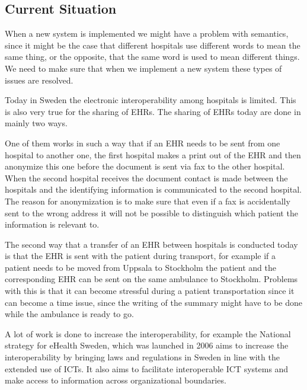 \documentclass[14pt]{article}
\begin{document}
\label{sec:interopDefinition}

\subsection{Current Situation} %
When a new system is implemented we might have a problem with semantics, since it might be the case that different hospitals use different words to mean the same thing, or the opposite, that the same word is used to mean different things. We need to make sure that when we implement a new system these types of issues are resolved.~\cite{Empirica}

Today in Sweden the electronic \gls{interoperability} among hospitals is limited. This is also very true for the sharing of \glspl{EHR}. The sharing of \glspl{EHR} today are done in mainly two ways.

One of them works in such a way that if an \gls{EHR} needs to be sent from one hospital to another one, the first hospital makes a print out of the \gls{EHR} and then anonymize this one before the document is sent via fax to the other hospital. When the second hospital receives the document contact is made between the hospitals and the identifying information is communicated to the second hospital.\cite{EPJ2} The reason for anonymization is to make sure that even if a fax is accidentally sent to the wrong address it will not be possible to distinguish which patient the information is relevant to.

The second way that a transfer of an \gls{EHR} between hospitals is conducted today is that the \gls{EHR} is sent with the patient during transport, for example if a patient needs to be moved from Uppsala to Stockholm the patient and the corresponding \gls{EHR} can be sent on the same ambulance to Stockholm\cite{EPJ2}. Problems with this is that it can become stressful during a patient transportation since it can become a time issue, since the writing of the summary might have to be done while the ambulance is ready to go\cite{EPJ2}.


A lot of work is done to increase the \gls{interoperability}, for example the National strategy for eHealth Sweden, which was launched in 2006 aims to increase the interoperability by bringing laws and regulations in Sweden in line with the extended use of \glspl{ICT}. It also aims to facilitate interoperable \gls{ICT} systems and make access to information across organizational boundaries\cite{NationalStrategy}. 
\end{document}
